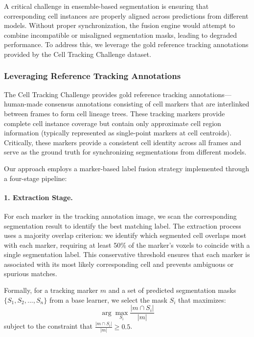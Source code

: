 A critical challenge in ensemble-based segmentation is ensuring that corresponding cell instances
are properly aligned across predictions from different models. Without proper synchronization, the
fusion engine would attempt to combine incompatible or misaligned segmentation masks, leading to
degraded performance. To address this, we leverage the gold reference tracking annotations provided
by the Cell Tracking Challenge dataset.

\subsubsection{Leveraging Reference Tracking Annotations}

The Cell Tracking Challenge provides gold reference tracking annotations—human-made consensus
annotations consisting of cell markers that are interlinked between frames to form cell lineage
trees. These tracking markers provide complete cell instance coverage but contain only approximate
cell region information (typically represented as single-point markers at cell centroids).
Critically, these markers provide a consistent cell identity across all frames and serve as the
ground truth for synchronizing segmentations from different models.

Our approach employs a marker-based label fusion strategy implemented through a four-stage
pipeline:

\paragraph{1. Extraction Stage.}
For each marker in the tracking annotation image, we scan the corresponding segmentation result to
identify the best matching label. The extraction process uses a majority overlap criterion: we
identify which segmented cell overlaps most with each marker, requiring at least 50\% of the
marker's voxels to coincide with a single segmentation label. This conservative threshold ensures
that each marker is associated with its most likely corresponding cell and prevents ambiguous or
spurious matches.

Formally, for a tracking marker $m$ and a set of predicted segmentation masks $\{S_1, S_2, ...,
S_n\}$ from a base learner, we select the mask $S_i$ that maximizes:
\begin{equation}
\arg\max_{S_i} \frac{|m \cap S_i|}{|m|}
\end{equation}
subject to the constraint that $\frac{|m \cap S_i|}{|m|} \geq 0.5$.

